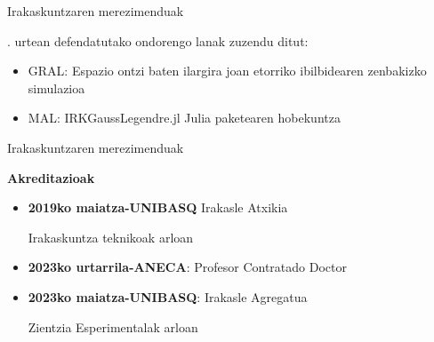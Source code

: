 \documentclass[
 10pt,%
 compress,%
 t,       %
 xcolor=svgnames
]{beamer}
\theoremstyle{definition} \newtheorem{definicion}{Definicion}[section]
\theoremstyle{propiedades} \newtheorem{propiedades}{Propiedades}[section]
\begin{document}
\begin{frame}{Irakaskuntzaren merezimenduak}
{\begin{itemize}
		. urtean defendatutako ondorengo lanak zuzendu ditut:
		 
		 \begin{itemize}
		 	\item GRAL: Espazio ontzi baten ilargira joan etorriko ibilbidearen zenbakizko simulazioa
		 	
		 	\item MAL:  IRKGaussLegendre.jl  Julia paketearen hobekuntza
		 \end{itemize}
		 
	\end{itemize}
	
	
	
}

\end{frame}




\begin{frame}{Irakaskuntzaren merezimenduak} 
	
\medskip


\textbf{Akreditazioak}
\begin{itemize}
	
	\medskip
	\item \textbf{2019ko maiatza-UNIBASQ} Irakasle Atxikia 
	
	Irakaskuntza teknikoak arloan 
	
	\medskip
	\item \textbf{2023ko urtarrila-ANECA}: Profesor Contratado Doctor
	
	
	\medskip
	\item \textbf{2023ko maiatza-UNIBASQ}: Irakasle Agregatua 

    Zientzia Esperimentalak arloan
    
\end{itemize}





\end{frame}
\end{document}
